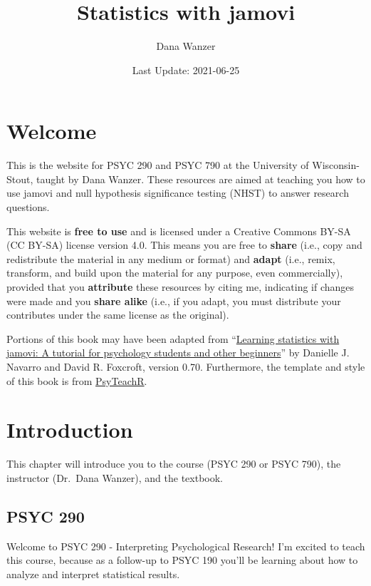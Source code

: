 \documentclass[
]{book}
\title{Statistics with jamovi}
\author{Dana Wanzer}
\date{Last Update: 2021-06-25}
\begin{document}
\maketitle

{
\setcounter{tocdepth}{1}
\tableofcontents
}
\hypertarget{welcome}{%
\chapter*{Welcome}\label{welcome}}

This is the website for PSYC 290 and PSYC 790 at the University of Wisconsin-Stout, taught by Dana Wanzer. These resources are aimed at teaching you how to use jamovi and null hypothesis significance testing (NHST) to answer research questions.

This website is \textbf{free to use} and is licensed under a Creative Commons BY-SA (CC BY-SA) license version 4.0. This means you are free to \textbf{share} (i.e., copy and redistribute the material in any medium or format) and \textbf{adapt} (i.e., remix, transform, and build upon the material for any purpose, even commercially), provided that you \textbf{attribute} these resources by citing me, indicating if changes were made and you \textbf{share alike} (i.e., if you adapt, you must distribute your contributes under the same license as the original).

Portions of this book may have been adapted from ``\href{http://www.learnstatswithjamovi.com}{Learning statistics with jamovi: A tutorial for psychology students and other beginners}'' by Danielle J. Navarro and David R. Foxcroft, version 0.70. Furthermore, the template and style of this book is from \href{https://psyteachr.github.io/book-template/setup.html}{PsyTeachR}.

\hypertarget{introduction}{%
\chapter{Introduction}\label{introduction}}

This chapter will introduce you to the course (PSYC 290 or PSYC 790), the instructor (Dr.~Dana Wanzer), and the textbook.

\hypertarget{psyc-290}{%
\section{PSYC 290}\label{psyc-290}}

Welcome to PSYC 290 - Interpreting Psychological Research! I'm excited to teach this course, because as a follow-up to PSYC 190 you'll be learning about how to analyze and interpret statistical results.
\end{document}
